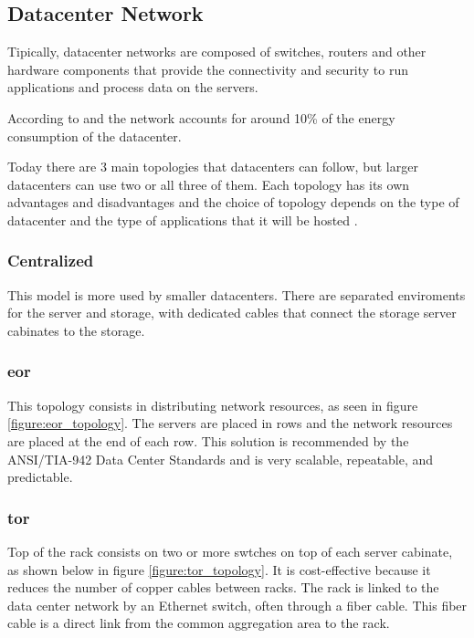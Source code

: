 \subsection{Datacenter Network}

Tipically, datacenter networks are composed of switches, routers and other hardware components that provide the connectivity and security to run applications and process data on the servers. 

According to \citet{Cheung} and \citet{Miyuru} the network accounts for around 10\% of the energy consumption of the datacenter. 

Today there are 3 main topologies that datacenters can follow, but larger datacenters can use two or all three of them. Each topology has its own advantages and disadvantages and the choice of topology depends on the type of datacenter and the type of applications that it will be hosted \citet{commScope}.

\subsubsection{Centralized}

This model is more used by smaller datacenters. There are separated enviroments for the server and storage, with dedicated  cables that connect the storage server cabinates to the storage.  

\subsubsection{\ac{eor}}

This topology consists in distributing network resources, as seen in figure \ref{figure:eor_topology}. The servers are placed in rows and the network resources are placed at the end of each row. This solution is recommended by the  ANSI/TIA-942 Data Center Standards \cite{ANSI/TIA-942} and is very scalable, repeatable, and predictable.

\subsubsection{\ac{tor}}

Top of the rack consists on two or more swtches on top of each server cabinate, as shown below in figure \ref{figure:tor_topology}. It is cost-effective because it reduces the number of copper cables between racks. The rack is linked to the data center network by an Ethernet switch, often through a fiber cable. This fiber cable is a direct link from the common aggregation area to the rack.

